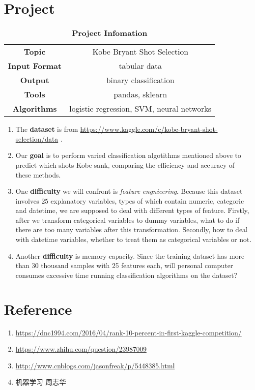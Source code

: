\documentclass[a4paper,11pt,onecolumn,twoside]{article}
\begin{document}
\section{Project}
\begin{table}[H]
	\centering
	\caption*{\textbf{Project Infomation}}
	\begin{tabular}{cc}
		\midrule[1.5pt]
		\textbf{Topic}& Kobe Bryant Shot Selection\\	
		\textbf{Input Format}&tabular data\\
		\textbf{Output}&binary classification\\
		\textbf{Tools}&pandas, sklearn\\
		\textbf{Algorithms}&logistic regression, SVM, neural networks\\
		\midrule[1.5pt]
	\end{tabular}
\end{table}
\begin{enumerate}
	\item The \textbf{dataset} is from \url{https://www.kaggle.com/c/kobe-bryant-shot-selection/data} .
	\item Our \textbf{goal} is to perform varied classification algotithms mentioned above to predict which shots Kobe sank, comparing the efficiency and accuracy of these methods.\par
	\item One \textbf{difficulty} we will confront is \textit{feature engnieering}. Because this dataset involves $25$ explanatory variables, types of which contain numeric, categoric and datetime, we are supposed to deal with different types of feature. Firstly, after we transform categorical variables to dummy variables, what to do if there are too many variables after this transformation. Secondly, how to deal with datetime variables, whether to treat them as categorical variables or not.\par
	\item Another \textbf{difficulty }is memory capacity. Since the training dataset has more than 30 thousand samples with 25 features each, will personal computer consumes excessive time running classification algorithms on the dataset?\par
\end{enumerate}
\section{Reference}
\begin{enumerate}
	\item \url{https://dnc1994.com/2016/04/rank-10-percent-in-first-kaggle-competition/}
	\item \url{https://www.zhihu.com/question/23987009}
	\item \url{http://www.cnblogs.com/jasonfreak/p/5448385.html}
	\item 机器学习\,\,周志华
\end{enumerate}
\end{document}
